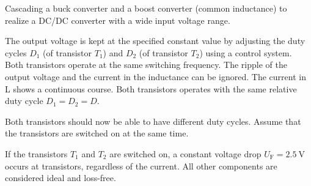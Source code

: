 
Cascading a buck converter and a boost converter (common inductance) to realize a DC/DC converter with a wide input voltage range.





The output voltage is kept at the specified constant value by adjusting the duty cycles $D_1$ 
(of transistor  $T_1$) and $D_2$ (of transistor $T_2$) using a control system. Both transistors operate at the same switching frequency.
The ripple of the output voltage and the current in the inductance can be ignored. The current in L shows a continuous course.
Both transistors operates with the same relative duty cycle $D_1 = D_2 = D$.

\vspace{2em}\par
Both transistors should now be able to have different duty cycles. Assume that the transistors are switched on at the same time.

\vspace{2em}\par
If the transistors $T_1$ and $T_2$ are switched on, a constant voltage drop $U_\mathrm{F}=\SI{2.5}{\volt}$ occurs at transistors,
 regardless of the current. All other components are considered ideal and loss-free.

